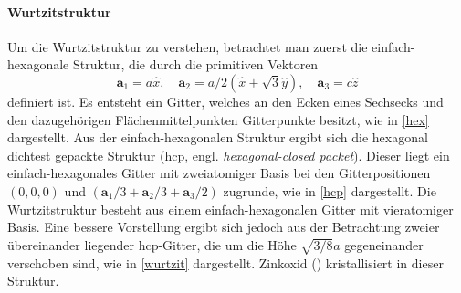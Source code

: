 \paragraph{Wurtzitstruktur}
Um die Wurtzitstruktur zu verstehen, betrachtet man zuerst die einfach-hexagonale Struktur, die durch die primitiven
Vektoren
\begin{equation}
    \mathbf{a}_1 = a\hat{x}, \quad
    \mathbf{a}_2 = a/2 (\hat{x} + \sqrt{3} \hat{y}), \quad
    \mathbf{a}_3 = c \hat{z}
\end{equation}
definiert ist.
Es entsteht ein Gitter, welches an den Ecken eines Sechsecks und den dazugehörigen Flächenmittelpunkten Gitterpunkte
besitzt, wie in \cref{hex} dargestellt.
Aus der einfach-hexagonalen Struktur ergibt sich die hexagonal dichtest gepackte Struktur
(hcp, engl. \textit{hexagonal-closed packet}).
Dieser liegt ein einfach-hexagonales Gitter mit zweiatomiger Basis bei den Gitterpositionen $(0,0,0)$ und
$(\mathbf{a}_1/3 + \mathbf{a}_2/3 + \mathbf{a}_3/2)$ zugrunde, wie in \cref{hcp} dargestellt.\autocite[97-98]{Ashcroft}
Die Wurtzitstruktur besteht aus einem einfach-hexagonalen Gitter mit vieratomiger Basis.
Eine bessere Vorstellung ergibt sich jedoch aus der Betrachtung zweier übereinander liegender hcp-Gitter, die um
die Höhe $\sqrt {3 / 8} a$ gegeneinander verschoben sind, wie in \cref{wurtzit} dargestellt.
Zinkoxid () kristallisiert in dieser Struktur.\autocite[47-48]{Grundmann}

